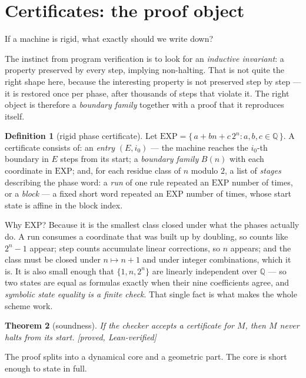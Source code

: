 \documentclass[11pt,a4paper]{article}
\theoremstyle{plain}
\newtheorem{theorem}{Theorem}[section]
\theoremstyle{definition}
\newtheorem{definition}[theorem]{Definition}
\newcommand{\Lean}{\textcolor{linkc}{\textsf{[proved, Lean-verified]}}}
\begin{document}
\section{Certificates: the proof object}\label{sec:cert}

If a machine is rigid, what exactly should we write down?

The instinct from program verification is to look for an \emph{inductive
invariant}: a property preserved by every step, implying non-halting.
That is not quite the right shape here, because the interesting property
is not preserved step by step --- it is restored once per phase, after
thousands of steps that violate it. The right object is therefore a
\emph{boundary family} together with a proof that it reproduces itself.

\begin{definition}[rigid phase certificate]\label{def:cert}
Let $\mathrm{EXP} = \{\,a + bn + c\,2^{n} : a,b,c \in \mathbb{Q}\,\}$. A
certificate consists of: an \emph{entry} $(E, i_0)$ --- the machine
reaches the $i_0$-th boundary in $E$ steps from its start; a
\emph{boundary family} $B(n)$ with each coordinate in $\mathrm{EXP}$; and,
for each residue class of $n$ modulo $2$, a list of \emph{stages}
describing the phase word: a \emph{run} of one rule repeated an
$\mathrm{EXP}$ number of times, or a \emph{block} --- a fixed short word
repeated an $\mathrm{EXP}$ number of times, whose start state is affine
in the block index.
\end{definition}

Why $\mathrm{EXP}$? Because it is the smallest class closed under what
the phases actually do. A run consumes a coordinate that was built up by
doubling, so counts like $2^{n}-1$ appear; step counts accumulate linear
corrections, so $n$ appears; and the class must be closed under
$n \mapsto n+1$ and under integer combinations, which it is. It is also
small enough that $\{1, n, 2^{n}\}$ are linearly independent over
$\mathbb{Q}$ --- so two states are equal as formulas exactly when their
nine coefficients agree, and \emph{symbolic state equality is a finite
check}. That single fact is what makes the whole scheme work.

\begin{theorem}[soundness]\label{thm:sound}
If the checker accepts a certificate for $M$, then $M$ never halts from
its start. \Lean
\end{theorem}

The proof splits into a dynamical core and a geometric part. The core is
short enough to state in full.
\end{document}
